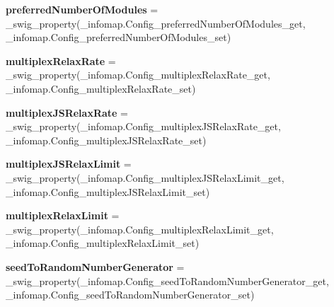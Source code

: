 \begin{DoxyCompactItemize}
\item 
\mbox{\label{classdsmacc_1_1graph_1_1infomap_1_1infomap_1_1Config_a2434375a60f9bb8f0252ad917c064171}} 
{\bfseries preferred\+Number\+Of\+Modules} = \+\_\+swig\+\_\+property(\+\_\+infomap.\+Config\+\_\+preferred\+Number\+Of\+Modules\+\_\+get, \+\_\+infomap.\+Config\+\_\+preferred\+Number\+Of\+Modules\+\_\+set)
\item 
\mbox{\label{classdsmacc_1_1graph_1_1infomap_1_1infomap_1_1Config_a79c1188f5467f2833d755afed326c828}} 
{\bfseries multiplex\+Relax\+Rate} = \+\_\+swig\+\_\+property(\+\_\+infomap.\+Config\+\_\+multiplex\+Relax\+Rate\+\_\+get, \+\_\+infomap.\+Config\+\_\+multiplex\+Relax\+Rate\+\_\+set)
\item 
\mbox{\label{classdsmacc_1_1graph_1_1infomap_1_1infomap_1_1Config_aa2199035b46d046076cdbb564f7d3394}} 
{\bfseries multiplex\+J\+S\+Relax\+Rate} = \+\_\+swig\+\_\+property(\+\_\+infomap.\+Config\+\_\+multiplex\+J\+S\+Relax\+Rate\+\_\+get, \+\_\+infomap.\+Config\+\_\+multiplex\+J\+S\+Relax\+Rate\+\_\+set)
\item 
\mbox{\label{classdsmacc_1_1graph_1_1infomap_1_1infomap_1_1Config_ad8bc2454a719b38b915a48bb354aa0ac}} 
{\bfseries multiplex\+J\+S\+Relax\+Limit} = \+\_\+swig\+\_\+property(\+\_\+infomap.\+Config\+\_\+multiplex\+J\+S\+Relax\+Limit\+\_\+get, \+\_\+infomap.\+Config\+\_\+multiplex\+J\+S\+Relax\+Limit\+\_\+set)
\item 
\mbox{\label{classdsmacc_1_1graph_1_1infomap_1_1infomap_1_1Config_a56711f6700eaa496c0db91bb45da18bc}} 
{\bfseries multiplex\+Relax\+Limit} = \+\_\+swig\+\_\+property(\+\_\+infomap.\+Config\+\_\+multiplex\+Relax\+Limit\+\_\+get, \+\_\+infomap.\+Config\+\_\+multiplex\+Relax\+Limit\+\_\+set)
\item 
\mbox{\label{classdsmacc_1_1graph_1_1infomap_1_1infomap_1_1Config_a2ba2ee8c5bbb495ad959b80f976fe46e}} 
{\bfseries seed\+To\+Random\+Number\+Generator} = \+\_\+swig\+\_\+property(\+\_\+infomap.\+Config\+\_\+seed\+To\+Random\+Number\+Generator\+\_\+get, \+\_\+infomap.\+Config\+\_\+seed\+To\+Random\+Number\+Generator\+\_\+set)

\end{DoxyCompactItemize}
